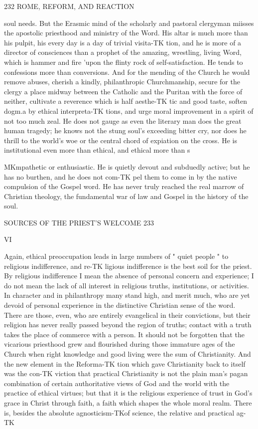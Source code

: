 \documentclass[12pt,a5paper,twoside]{book}
\begin{document}
{{232 ROME, REFORM, AND REACTION 

soul needs. But the Erasmic mind of the scholarly 
and pastoral clergyman miisses the apostolic priesthood 
and ministry of the Word. His altar is much more 
than his pulpit, his every day is a day of trivial visita-TK
tion, and he is more of a director of consciences than 
a prophet of the amazing, wrestling, living Word, 
which is hammer and fire 'upon the flinty rock of 
self-satisfaction. He tends to confessions more than 
conversions. And for the mending of the Church he 
would remove abuses, cherish a kindly, philanthropic 
Churchmanship, secure for the clergy a place midway 
between the Catholic and the Puritan with the force 
of neither, cultivate a reverence which is half aesthe-TK
tic and good taste, soften dogm.a by ethical interpreta-TK
tions, and urge moral improvement in a spirit of not 
too much zeal. He does not gauge as even the 
literary man does the great human tragedy; he 
knows not the stung soul's exceeding bitter cry, nor 
does he thrill to the world's woe or the central chord 
of expiation on the cross. He is institutional even 
more than ethical, and ethical more than s}MKmpathetic 
or enthusiastic. He is quietly devout and subduedly 
active; but he has no burthen, and he does not com-TK
pel them to come in by the native compulsion of the 
Gospel word. He has never truly reached the real 
marrow of Christian theology, the fundamental war 
of law and Gospel in the history of the soul. 



SOURCES OF THE PRIEST'S WELCOME 233 

VI 

Again, ethical preoccupation leads in large numbers 
of " quiet people " to religious indifference, and re-TK
ligious indifference is the best soil for the priest. By 
religious indifference I mean the absence of personal 
concern and experience; I do not mean the lack of all 
interest in religious truths, institutions, or activities. 
In character and in philanthropy many stand high, and 
merit much, who are yet devoid of personal experience 
in the distinctive Christian sense of the word. There 
are those, even, who are entirely evangelical in their 
convictions, but their religion has never really passed 
beyond the region of truths; contact with a truth takes 
the place of commerce with a person. It should not 
be forgotten that the vicarious priesthood grew and 
flourished during those immature ages of the Church 
when right knowledge and good living were the sum of 
Christianity. And the new element in the Reforma-TK
tion which gave Christianity back to itself was the con-TK
viction that practical Christianity is not the plain man's 
pagan combination of certain authoritative views of God 
and the world with the practice of ethical virtues; but 
that it is the religious experience of trust in God's 
grace in Christ through faith, a faith which shapes the 
whole moral realm. There is, besides the absolute 
agnosticism-TKof science, the relative and practical ag-TK



}
\end{document}
